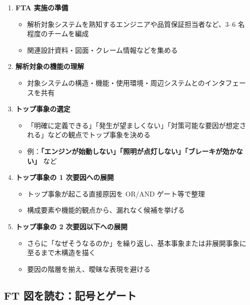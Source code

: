 \begin{enumerate}
 \item \textbf{FTA 実施の準備}  
   \begin{itemize}
    \item 解析対象システムを熟知するエンジニアや品質保証担当者など、3--6 名程度のチームを編成
    \item 関連設計資料・図面・クレーム情報などを集める
   \end{itemize}

 \item \textbf{解析対象の機能の理解}  
   \begin{itemize}
    \item 対象システムの構造・機能・使用環境・周辺システムとのインタフェースを共有
   \end{itemize}

 \item \textbf{トップ事象の選定}  
   \begin{itemize}
    \item 「明確に定義できる」「発生が望ましくない」「対策可能な要因が想定される」などの観点でトップ事象を決める
    \item 例：\textbf{「エンジンが始動しない」「照明が点灯しない」「ブレーキが効かない」} など
   \end{itemize}

 \item \textbf{トップ事象の 1 次要因への展開}  
   \begin{itemize}
    \item トップ事象が起こる直接原因を OR/AND ゲート等で整理
    \item 構成要素や機能的観点から、漏れなく候補を挙げる
   \end{itemize}

 \item \textbf{トップ事象の 2 次要因以下への展開}  
   \begin{itemize}
    \item さらに「なぜそうなるのか」を繰り返し、基本事象または非展開事象に至るまで木構造を描く
    \item 要因の階層を揃え、曖昧な表現を避ける
   \end{itemize}
\end{enumerate}

\subsection{FT 図を読む：記号とゲート}

